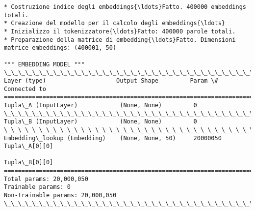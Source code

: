 \documentclass[11pt]{article}
\begin{document}
    \begin{Verbatim}[commandchars=\\\{\}]
* Costruzione indice degli embeddings{\ldots}Fatto. 400000 embeddings totali.
* Creazione del modello per il calcolo degli embeddings{\ldots}
* Inizializzo il tokenizzatore{\ldots}Fatto: 400000 parole totali.
* Preparazione della matrice di embedding{\ldots}Fatto. Dimensioni matrice embeddings: (400001, 50)

°°° EMBEDDING MODEL °°°
\_\_\_\_\_\_\_\_\_\_\_\_\_\_\_\_\_\_\_\_\_\_\_\_\_\_\_\_\_\_\_\_\_\_\_\_\_\_\_\_\_\_\_\_\_\_\_\_\_\_\_\_\_\_\_\_\_\_\_\_\_\_\_\_\_\_\_\_\_\_\_\_\_\_\_\_\_\_\_\_\_\_\_\_\_\_\_\_\_\_\_\_\_\_\_\_\_\_
Layer (type)                    Output Shape         Param \#     Connected to                     
==================================================================================================
Tupla\_A (InputLayer)            (None, None)         0                                            
\_\_\_\_\_\_\_\_\_\_\_\_\_\_\_\_\_\_\_\_\_\_\_\_\_\_\_\_\_\_\_\_\_\_\_\_\_\_\_\_\_\_\_\_\_\_\_\_\_\_\_\_\_\_\_\_\_\_\_\_\_\_\_\_\_\_\_\_\_\_\_\_\_\_\_\_\_\_\_\_\_\_\_\_\_\_\_\_\_\_\_\_\_\_\_\_\_\_
Tupla\_B (InputLayer)            (None, None)         0                                            
\_\_\_\_\_\_\_\_\_\_\_\_\_\_\_\_\_\_\_\_\_\_\_\_\_\_\_\_\_\_\_\_\_\_\_\_\_\_\_\_\_\_\_\_\_\_\_\_\_\_\_\_\_\_\_\_\_\_\_\_\_\_\_\_\_\_\_\_\_\_\_\_\_\_\_\_\_\_\_\_\_\_\_\_\_\_\_\_\_\_\_\_\_\_\_\_\_\_
Embedding\_lookup (Embedding)    (None, None, 50)     20000050    Tupla\_A[0][0]                    
                                                                 Tupla\_B[0][0]                    
==================================================================================================
Total params: 20,000,050
Trainable params: 0
Non-trainable params: 20,000,050
\_\_\_\_\_\_\_\_\_\_\_\_\_\_\_\_\_\_\_\_\_\_\_\_\_\_\_\_\_\_\_\_\_\_\_\_\_\_\_\_\_\_\_\_\_\_\_\_\_\_\_\_\_\_\_\_\_\_\_\_\_\_\_\_\_\_\_\_\_\_\_\_\_\_\_\_\_\_\_\_\_\_\_\_\_\_\_\_\_\_\_\_\_\_\_\_\_\_

    \end{Verbatim}
\end{document}
